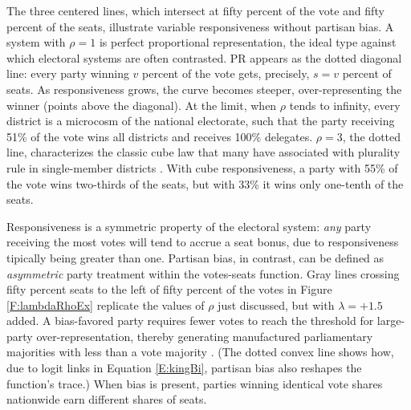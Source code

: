\documentclass[letter,12pt]{article}
\begin{document}
The three centered lines, which intersect at fifty percent of the vote and fifty percent of the seats, illustrate variable responsiveness without partisan bias. A system with $\rho=1$ is perfect proportional representation, the ideal type against which electoral systems are often contrasted. PR appears as the dotted diagonal line: every party winning $v$ percent of the vote gets, precisely, $s=v$ percent of seats. As responsiveness grows, the curve becomes steeper, over-representing the winner (points above the diagonal). At the limit, when $\rho$ tends to infinity, every district is a microcosm of the national electorate, such that the party receiving 51\% of the vote wins all districts and receives 100\% delegates. $\rho=3$, the dotted line, characterizes the classic cube law that many have associated with plurality rule in single-member districts \citep{taagepera.CubeLaw.1973}. With cube responsiveness, a party with 55\% of the vote wins two-thirds of the seats, but with 33\% it wins only one-tenth of the seats. 

Responsiveness is a symmetric property of the electoral system: \emph{any} party receiving the most votes will tend to accrue a seat bonus, due to responsiveness tipically being greater than one. Partisan bias, in contrast, can be defined as \emph{asymmetric} party treatment within the votes-seats function. Gray lines crossing fifty percent seats to the left of fifty percent of the votes in Figure \ref{F:lambdaRhoEx} replicate the values of $\rho$ just discussed, but with $\lambda = +1.5$ added. A bias-favored party requires fewer votes to reach the threshold for large-party over-representation, thereby generating manufactured parliamentary majorities with less than a vote majority \citep{lijphartElSysPtySys.1994}. (The dotted convex line shows how, due to logit links in Equation \ref{E:kingBi}, partisan bias also reshapes the function's trace.) When bias is present, parties winning identical vote shares nationwide earn different shares of seats. 

\end{document}

